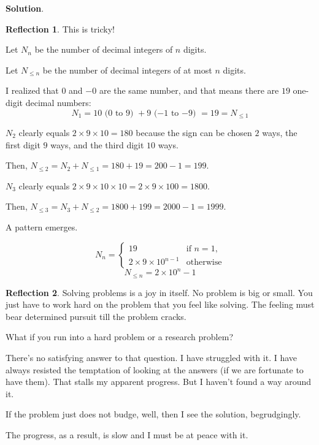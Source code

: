 \documentclass[11pt]{book}
\theoremstyle{definition}
\theoremstyle{plain}
\theoremstyle{definition}
\theoremstyle{problemstyle}
\theoremstyle{remark}
\theoremstyle{definition}
\newtheorem{reflection}{Reflection}
\begin{document}
\textbf{Solution}.
\begin{reflection}
    This is tricky! 

    Let $N_n$ be the number of decimal integers of $n$ digits.

    Let $N_{\leq n}$ be the number of decimal integers of at most $n$ digits.

    I realized that $0$ and $-0$ are the same number, and that means there are $19$ one-digit decimal numbers: 
    \[
        N_1=10\text{ ($0$ to $9$) }+9\text{ ($-1$ to $-9$) }=19=N_{\leq1}
    \]

    $N_2$ clearly equals $2\times9\times10=180$ because the sign can be chosen $2$ ways, the first digit $9$ ways, and the third digit $10$ ways. 

    Then, $N_{\leq2}=N_2+N_{\leq1}=180+19=200-1=199$.

    $N_3$ clearly equals $2\times9\times10\times10=2\times9\times100=1800$. 

    Then, $N_{\leq3}=N_3+N_{\leq2}=1800+199=2000-1=1999$.

    A pattern emerges.

\end{reflection}

\[
N_n = \begin{cases} 
    19 & \text{if } n=1, \\
    2\times9\times10^{n-1} & \text{otherwise}
\end{cases}
\]
\[
    N_{\leq n}=2\times10^{n}-1 
\]

\begin{reflection}
    Solving problems is a joy in itself. No problem is big or small. You just have to work hard on the problem that you feel like solving. The feeling must bear determined pursuit till the problem cracks.

    What if you run into a hard problem or a research problem? 

    There's no satisfying answer to that question. I have struggled with it. I have always resisted the temptation of looking at the answers (if we are fortunate to have them). That stalls my apparent progress. But I haven't found a way around it.

    If the problem just does not budge, well, then I see the solution, begrudgingly.

    The progress, as a result, is slow and I must be at peace with it.
\end{reflection}
\end{document}
